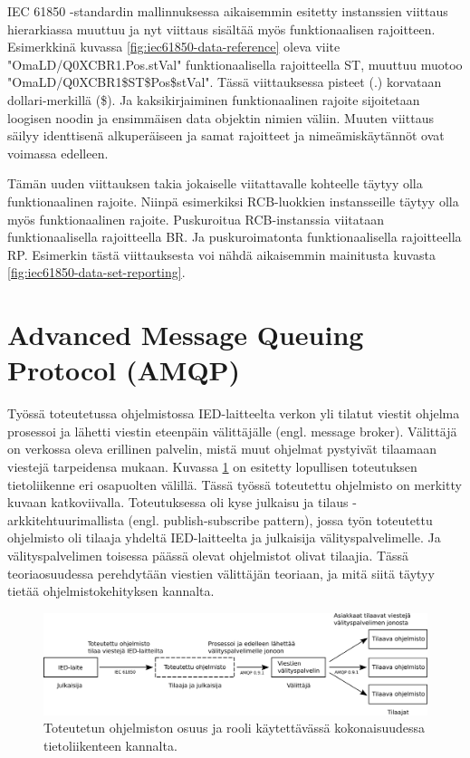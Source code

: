 IEC 61850 -standardin mallinnuksessa aikaisemmin esitetty instanssien viittaus hierarkiassa muuttuu ja nyt viittaus sisältää myös funktionaalisen rajoitteen. Esimerkkinä kuvassa \ref{fig:iec61850-data-reference} oleva viite "OmaLD/Q0XCBR1.Pos.stVal" funktionaalisella rajoitteella ST, muuttuu muotoo "OmaLD/Q0XCBR1\$ST\$Pos\$stVal". Tässä viittauksessa pisteet (.) korvataan dollari-merkillä (\$). Ja kaksikirjaiminen funktionaalinen rajoite sijoitetaan loogisen noodin ja ensimmäisen data objektin nimien väliin. Muuten viittaus säilyy identtisenä alkuperäiseen ja samat rajoitteet ja nimeämiskäytännöt ovat voimassa edelleen. \cite[s.~34--35, 111]{IEC61850-8-1}

Tämän uuden viittauksen takia jokaiselle viitattavalle kohteelle täytyy olla funktionaalinen rajoite. Niinpä esimerkiksi RCB-luokkien instansseille täytyy olla myös funktionaalinen rajoite. Puskuroitua RCB-instanssia viitataan funktionaalisella rajoitteella BR. Ja puskuroimatonta funktionaalisella rajoitteella RP. Esimerkin tästä viittauksesta voi nähdä aikaisemmin mainitusta kuvasta \ref{fig:iec61850-data-set-reporting}. \cite[s.~32--34, 75]{IEC61850-8-1}


\section{Advanced Message Queuing Protocol (AMQP)}
Työssä toteutetussa ohjelmistossa IED-laitteelta verkon yli tilatut viestit ohjelma prosessoi ja lähetti viestin eteenpäin välittäjälle (engl. message broker). Välittäjä on verkossa oleva erillinen palvelin, mistä muut ohjelmat pystyivät tilaamaan viestejä tarpeidensa mukaan. Kuvassa \ref{fig:implemented-system-communication} on esitetty lopullisen toteutuksen tietoliikenne eri osapuolten välillä. Tässä työssä toteutettu ohjelmisto on merkitty kuvaan katkoviivalla. Toteutuksessa oli kyse julkaisu ja tilaus -arkkitehtuurimallista (engl. publish-subscribe pattern), jossa työn toteutettu ohjelmisto oli tilaaja yhdeltä IED-laitteelta ja julkaisija välityspalvelimelle. Ja välityspalvelimen toisessa päässä olevat ohjelmistot olivat tilaajia. Tässä teoriaosuudessa perehdytään viestien välittäjän teoriaan, ja mitä siitä täytyy tietää ohjelmistokehityksen kannalta.

\begin{figure}[ht!]
	\includegraphics[width=1\textwidth]{pictures/implemented-system-communication.png}
	\caption{Toteutetun ohjelmiston osuus ja rooli käytettävässä kokonaisuudessa tietoliikenteen kannalta.}
	\label{fig:implemented-system-communication}
\end{figure}

